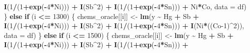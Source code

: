 \documentclass[12pt, twoside]{amherstthesis}
\newenvironment{Shaded}{\begin{snugshade}}{\end{snugshade}}
\newcommand{\AttributeTok}[1]{\textcolor[rgb]{0.13,0.29,0.53}{#1}}
\newcommand{\ControlFlowTok}[1]{\textcolor[rgb]{0.13,0.29,0.53}{\textbf{#1}}}
\newcommand{\DecValTok}[1]{\textcolor[rgb]{0.00,0.00,0.81}{#1}}
\newcommand{\FunctionTok}[1]{\textcolor[rgb]{0.13,0.29,0.53}{\textbf{#1}}}
\newcommand{\NormalTok}[1]{#1}
\newcommand{\OtherTok}[1]{\textcolor[rgb]{0.56,0.35,0.01}{#1}}
\newcommand{\SpecialCharTok}[1]{\textcolor[rgb]{0.81,0.36,0.00}{\textbf{#1}}}
\begin{document}
\begin{Shaded}
\begin{Highlighting}[]
                                \FunctionTok{I}\NormalTok{(}\DecValTok{1}\SpecialCharTok{/}\NormalTok{(}\DecValTok{1}\SpecialCharTok{+}\FunctionTok{exp}\NormalTok{(}\SpecialCharTok{{-}}\DecValTok{4}\SpecialCharTok{*}\NormalTok{Ni))) }\SpecialCharTok{+} \FunctionTok{I}\NormalTok{(Sb}\SpecialCharTok{\^{}}\DecValTok{2}\NormalTok{) }\SpecialCharTok{+} \FunctionTok{I}\NormalTok{(}\DecValTok{1}\SpecialCharTok{/}\NormalTok{(}\DecValTok{1}\SpecialCharTok{+}\FunctionTok{exp}\NormalTok{(}\SpecialCharTok{{-}}\DecValTok{4}\SpecialCharTok{*}\NormalTok{Sn))) }\SpecialCharTok{+}
\NormalTok{                                Ni}\SpecialCharTok{*}\NormalTok{Co, }\AttributeTok{data =}\NormalTok{ df)}
\NormalTok{    \} }\ControlFlowTok{else} \ControlFlowTok{if}\NormalTok{ (i }\SpecialCharTok{\textless{}=} \DecValTok{1300}\NormalTok{) \{}
\NormalTok{      chems\_oracle[[i]] }\OtherTok{\textless{}{-}} \FunctionTok{lm}\NormalTok{(y }\SpecialCharTok{\textasciitilde{}}\NormalTok{ Hg }\SpecialCharTok{+}\NormalTok{ Sb }\SpecialCharTok{+}
                                \FunctionTok{I}\NormalTok{(}\DecValTok{1}\SpecialCharTok{/}\NormalTok{(}\DecValTok{1}\SpecialCharTok{+}\FunctionTok{exp}\NormalTok{(}\SpecialCharTok{{-}}\DecValTok{4}\SpecialCharTok{*}\NormalTok{Ni))) }\SpecialCharTok{+} \FunctionTok{I}\NormalTok{(Sb}\SpecialCharTok{\^{}}\DecValTok{2}\NormalTok{) }\SpecialCharTok{+} \FunctionTok{I}\NormalTok{(}\DecValTok{1}\SpecialCharTok{/}\NormalTok{(}\DecValTok{1}\SpecialCharTok{+}\FunctionTok{exp}\NormalTok{(}\SpecialCharTok{{-}}\DecValTok{4}\SpecialCharTok{*}\NormalTok{Sn))) }\SpecialCharTok{+}
                                \FunctionTok{I}\NormalTok{(Ni}\SpecialCharTok{*}\NormalTok{((Co}\DecValTok{{-}1}\NormalTok{)}\SpecialCharTok{\^{}}\DecValTok{2}\NormalTok{)), }\AttributeTok{data =}\NormalTok{ df)}
\NormalTok{    \} }\ControlFlowTok{else} \ControlFlowTok{if}\NormalTok{ (i }\SpecialCharTok{\textless{}=} \DecValTok{1500}\NormalTok{) \{}
\NormalTok{      chems\_oracle[[i]] }\OtherTok{\textless{}{-}} \FunctionTok{lm}\NormalTok{(y }\SpecialCharTok{\textasciitilde{}}\NormalTok{ Hg }\SpecialCharTok{+}\NormalTok{ Sb }\SpecialCharTok{+}
                                \FunctionTok{I}\NormalTok{(}\DecValTok{1}\SpecialCharTok{/}\NormalTok{(}\DecValTok{1}\SpecialCharTok{+}\FunctionTok{exp}\NormalTok{(}\SpecialCharTok{{-}}\DecValTok{4}\SpecialCharTok{*}\NormalTok{Ni))) }\SpecialCharTok{+} \FunctionTok{I}\NormalTok{(Sb}\SpecialCharTok{\^{}}\DecValTok{2}\NormalTok{) }\SpecialCharTok{+} \FunctionTok{I}\NormalTok{(}\DecValTok{1}\SpecialCharTok{/}\NormalTok{(}\DecValTok{1}\SpecialCharTok{+}\FunctionTok{exp}\NormalTok{(}\SpecialCharTok{{-}}\DecValTok{4}\SpecialCharTok{*}\NormalTok{Sn))) }\SpecialCharTok{+}

\end{Highlighting}
\end{Shaded}
\end{document}
